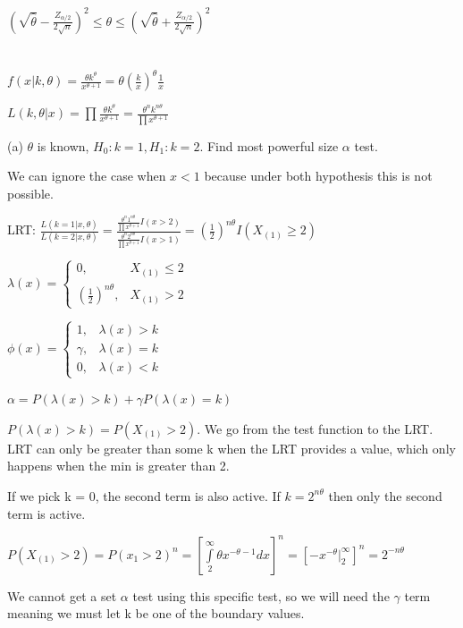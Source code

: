 \documentclass{article}
\let\Oldint=\int
\let\Oldprod=\prod
\renewcommand{\int}{\Oldint\limits}
\renewcommand{\prod}{\Oldprod\limits}
\begin{document}
$(\sqrt{\hat{\theta}} - \frac{Z_{\alpha/2}}{2\sqrt{n}})^2 \le \theta \le (\sqrt{\hat{\theta}} + \frac{Z_{\alpha/2}}{2\sqrt{n}})^2$

\section{}

$f(x|k,\theta) = \frac{\theta k^{\theta}}{x^{\theta+1}} = \theta (\frac{k}{x})^{\theta}\frac{1}{x}$

$L(k,\theta|x) = \prod \frac{\theta k^{\theta}}{x^{\theta+1}} = \frac{\theta^n k^{n\theta}}{\prod x^{\theta + 1}}$

(a) $\theta$ is known, $H_0: k = 1, H_1: k = 2$. Find most powerful size $\alpha$ test.

We can ignore the case when $x<1$ because under both hypothesis this is not possible. 

LRT: $\frac{L(k=1|x,\theta)}{L(k=2|x,\theta)} = \frac{\frac{\theta^n 1^{n\theta}}{\prod x^{\theta + 1}} I(x > 2)}{\frac{\theta^n 2^{n\theta}}{\prod x^{\theta + 1}}I(x>1)} = (\frac{1}{2})^{n\theta}I(X_{(1)} \ge 2)$

$\lambda(x) = \begin{cases} 0, & X_{(1)} \le 2 \\ (\frac{1}{2})^{n\theta}, & X_{(1)} > 2 \end{cases}$

$\phi(x) = \begin{cases} 1, & \lambda(x) > k \\ \gamma, &\lambda(x) = k \\ 0, & \lambda(x) < k \end{cases}$

$\alpha = P(\lambda(x) > k) + \gamma P(\lambda(x) = k)$

$P(\lambda(x) > k) = P(X_{(1)} > 2)$. We go from the test function to the LRT. LRT can only be greater than some k when the LRT provides a value, which only happens when the min is greater than 2. 

If we pick k = 0, the second term is also active. If $k = 2^{n\theta}$ then only the second term is active.

$P(X_{(1)} > 2) = P(x_1 > 2)^n = [\int_2^{\infty} \theta x^{-\theta - 1} dx]^n = [-x^{-\theta}|_2^{\infty}]^n = 2^{-n\theta}$

We cannot get a set $\alpha$ test using this specific test, so we will need the $\gamma$ term meaning we must let k be one of the boundary values. 
\end{document}
